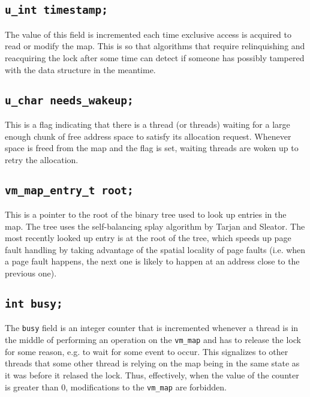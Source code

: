 \documentclass[shortabstract, english]{iithesis}
\begin{document}
\subsection*{\texttt{u_int timestamp;}}
The value of this field is incremented each time exclusive access is acquired to
read or modify the map. This is so that algorithms that require relinquishing
and reacquiring the lock after some time can detect if someone has possibly
tampered with the data structure in the meantime.

\subsection*{\texttt{u_char needs_wakeup;}}
This is a flag indicating that there is a thread (or threads) waiting for a
large enough chunk of free address space to satisfy its allocation request.
Whenever space is freed from the map and the flag is set, waiting threads are
woken up to retry the allocation.

\subsection*{\texttt{vm_map_entry_t root;}}
This is a pointer to the root of the binary tree used to look up entries in the
map. The tree uses the self-balancing splay algorithm by Tarjan and Sleator. The
most recently looked up entry is at the root of the tree, which speeds up page
fault handling by taking advantage of the spatial locality of page faults (i.e.
when a page fault happens, the next one is likely to happen at an address close
to the previous one).

\subsection*{\texttt{int busy;}}
The \texttt{busy} field is an integer counter that is incremented whenever a
thread is in the middle of performing an operation on the \texttt{vm\_map} and
has to release the lock for some reason, e.g. to wait for some event to occur.
This signalizes to other threads that some other thread is relying on the map
being in the same state as it was before it relased the lock. Thus, effectively,
when the value of the counter is greater than 0, modifications to the
\texttt{vm\_map} are forbidden.


\end{document}
